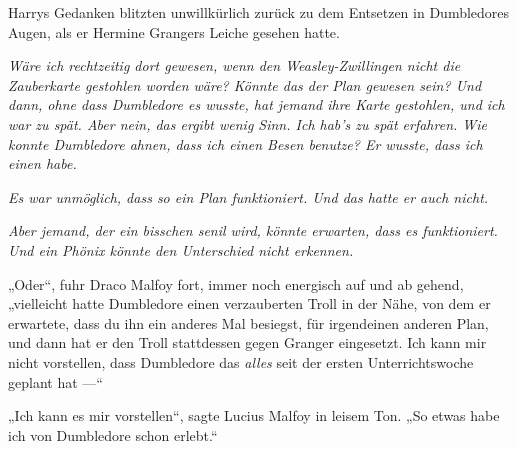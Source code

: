 Harrys Gedanken blitzten unwillkürlich zurück zu dem Entsetzen in Dumbledores Augen, als er Hermine Grangers Leiche gesehen hatte.

\emph{Wäre ich rechtzeitig dort gewesen, wenn den Weasley-Zwillingen nicht die Zauberkarte gestohlen worden wäre? Könnte das der Plan gewesen sein? Und dann, ohne dass Dumbledore es wusste, hat jemand ihre Karte gestohlen, und ich war zu spät. Aber nein, das ergibt wenig Sinn. Ich hab’s zu spät erfahren. Wie konnte Dumbledore ahnen, dass ich einen Besen benutze? Er wusste, dass ich einen habe.}


\emph{Es war unmöglich, dass so ein Plan funktioniert. Und das hatte er auch nicht.}

\emph{Aber jemand, der ein bisschen senil wird, könnte \emph{erwarten}, dass es funktioniert. Und ein Phönix könnte den Unterschied nicht erkennen.}

„Oder“, fuhr Draco Malfoy fort, immer noch energisch auf und ab gehend, „vielleicht hatte Dumbledore einen verzauberten Troll in der Nähe, von dem er erwartete, dass du ihn ein anderes Mal besiegst, für irgendeinen anderen Plan, und dann hat er den Troll stattdessen gegen Granger eingesetzt. Ich kann mir nicht vorstellen, dass Dumbledore das \emph{alles} seit der ersten Unterrichtswoche geplant hat —“

„Ich kann es mir vorstellen“, sagte Lucius Malfoy in leisem Ton.
„So etwas habe ich von Dumbledore schon erlebt.“

